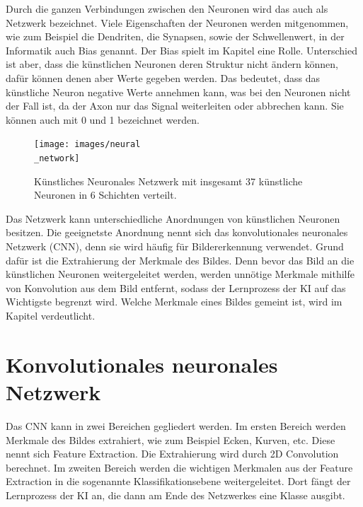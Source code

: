 \documentclass[11pt]{article}
\begin{document}
Durch die ganzen Verbindungen zwischen den Neuronen wird das auch als Netzwerk bezeichnet. Viele Eigenschaften der Neuronen werden mitgenommen, wie zum Beispiel die Dendriten, die Synapsen, sowie
der Schwellenwert, in der Informatik auch Bias genannt. Der Bias spielt im Kapitel  eine Rolle. Unterschied ist aber,
dass die künstlichen Neuronen deren Struktur nicht ändern können, dafür können denen aber Werte gegeben werden. Das bedeutet, dass das künstliche Neuron
negative Werte annehmen kann, was bei den Neuronen nicht der Fall ist, da der Axon nur das Signal weiterleiten oder abbrechen kann. Sie können auch mit 0 und 1 bezeichnet werden.
\begin{figure}[h]
    \centering
    \texttt{[image: images/neural\\\_network]}
    \caption[Künstliches Neuronales Netzwerk]{Künstliches Neuronales Netzwerk mit insgesamt 37 künstliche Neuronen in 6 Schichten verteilt.}\label{fnnpic}
\end{figure}
Das Netzwerk kann unterschiedliche Anordnungen von künstlichen Neuronen besitzen. Die geeignetste Anordnung nennt sich das
konvolutionales neuronales Netzwerk (CNN), denn sie wird häufig für Bildererkennung verwendet. Grund dafür ist die Extrahierung der Merkmale
des Bildes. Denn bevor das Bild an die künstlichen Neuronen weitergeleitet werden, werden unnötige Merkmale mithilfe von Konvolution aus dem Bild entfernt, sodass der
Lernprozess der KI auf das Wichtigste begrenzt wird. Welche Merkmale eines Bildes gemeint ist, wird im Kapitel  verdeutlicht.

\section{Konvolutionales neuronales Netzwerk}

Das CNN kann in zwei Bereichen gegliedert werden. Im ersten Bereich werden Merkmale des Bildes extrahiert, wie zum Beispiel Ecken, Kurven, etc. Diese nennt sich Feature Extraction.
Die Extrahierung wird durch 2D Convolution berechnet. Im zweiten Bereich werden die
wichtigen Merkmalen aus der Feature Extraction in die sogenannte Klassifikationsebene weitergeleitet. Dort fängt der Lernprozess
der KI an, die dann am Ende des Netzwerkes eine Klasse ausgibt.
\end{document}
